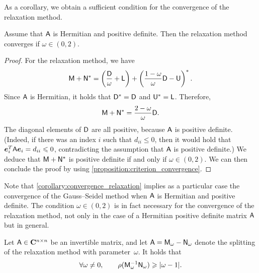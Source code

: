 As a corollary,
we obtain a sufficient condition for the convergence of the relaxation method.
\begin{corollary}
    \label{corollary:convergence_relaxation}
    Assume that $\mathsf A$ is Hermitian and positive definite.
    Then the relaxation method converges if $\omega \in (0, 2)$.
\end{corollary}
\begin{proof}
    For the relaxation method,
    we have
    \[
        \mathsf M + \mathsf N^*
        = \left( \frac{\mathsf D}{\omega} + \mathsf L \right) + \left(\frac{1 - \omega}{\omega} \mathsf D - \mathsf U \right)^*.
    \]
    Since $\mathsf A$ is Hermitian,
    it holds that $\mathsf D^* = \mathsf D$ and $\mathsf U^* = \mathsf L$.
    Therefore,
    \[
        \mathsf M + \mathsf N^*
        = \frac{2 - \omega}{\omega} \mathsf D.
    \]
    The diagonal elements of $\mathsf D$ are all positive,
    because $\mathsf A$ is positive definite.
    (Indeed, if there was an index $i$ such that $d_{ii} \leq 0$,
    then it would hold that $\mathbf{\boldsymbol{e}}_i^T \mathsf A \mathbf{\boldsymbol{e}}_i = d_{ii} \leqslant 0$,
    contradicting the assumption that $\mathsf A$ is positive definite.)
    We deduce that $\mathsf M + \mathsf N^*$ is positive definite if and only if $\omega \in (0, 2)$.
    We can then conclude the proof by using \cref{proposition:criterion_convergence}.
\end{proof}
Note that \cref{corollary:convergence_relaxation} implies as a particular case
the convergence of the Gauss--Seidel method when $\mathsf A$ is Hermitian and positive definite.
The condition $\omega \in (0, 2)$ is in fact necessary for the convergence of the relaxation method,
not only in the case of a Hermitian positive definite matrix $\mathsf A$ but in general.
\begin{proposition}
    \label{proposition:necessary_sor}
    Let $\mathsf A \in \mathbf C^{n \times n}$ be an invertible matrix,
    and let $\mathsf A = \mathsf M_{\omega} - \mathsf N_{\omega}$ denote the splitting of the relaxation method with parameter~$\omega$.
    It holds that
    \[
        \forall \omega \neq 0, \qquad
        \rho(\mathsf M_{\omega}^{-1} \mathsf N_{\omega})
        \geqslant \lvert\omega - 1\rvert.
    \]
\end{proposition}
